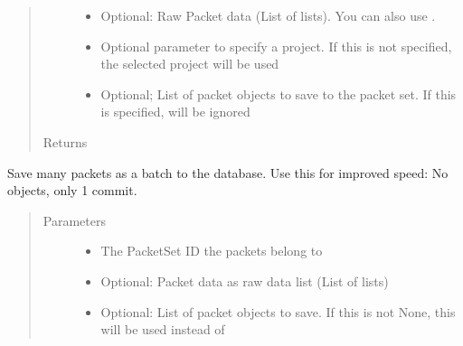 \documentclass[letterpaper,10pt,english]{sphinxmanual}
\begin{document}
\begin{fulllineitems}
\begin{fulllineitems}
\begin{quote}
\begin{description}
\begin{itemize}
\item {} 
 \textendash{} Optional: Raw Packet data (List of lists). You can also use .

\item {} 
 \textendash{} Optional parameter to specify a project. If this is not specified, the selected project
will be used

\item {} 
 \textendash{} Optional; List of packet objects to save to the packet set.
If this is specified,  will be ignored

\end{itemize}

\item[{Returns}] \leavevmode


\end{description}\end{quote}

\end{fulllineitems}


\begin{fulllineitems}
\label{\detokenize{src:src.Database.Database.savePacketsBatch}}
Save many packets as a batch to the database.
Use this for improved speed: No objects, only 1 commit.
\begin{quote}\begin{description}
\item[{Parameters}] \leavevmode\begin{itemize}
\item {} 
 \textendash{} The PacketSet ID the packets belong to

\item {} 
 \textendash{} Optional: Packet data as raw data list (List of lists)

\item {} 
 \textendash{} Optional: List of packet objects to save. If this is not None, this will be used instead of

\end{itemize}


\end{description}
\end{quote}
\end{fulllineitems}
\end{fulllineitems}
\end{document}
